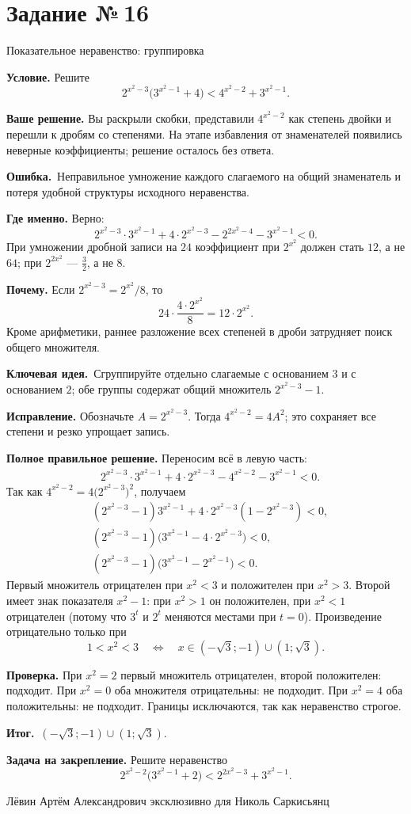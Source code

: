 \documentclass[a4paper,11pt]{article}
\newcommand{\Hdr}[1]{\par\vspace{2pt}\noindent\textbf{#1}\quad}
\newcommand{\E}{\par\smallskip\noindent\textcolor{errorred}{\textbf{Ошибка.}}\ }
\newcommand{\K}{\par\smallskip\noindent\textcolor{accent}{\textbf{Ключевая идея.}}\ }
\newcommand{\I}{\par\smallskip\noindent\textcolor{accent}{\textbf{Итог.}}\ }
\newcommand{\Task}[2]{\clearpage\phantomsection\label{task:#1}\section*{Задание №\,#1}\textcolor{accent}{#2}\par\vspace{7pt}}
\newcommand{\Footer}{\par\vfill\begin{center}\footnotesize\color{ink}Лёвин Артём Александрович эксклюзивно для Николь Саркисьянц\end{center}}
\begin{document}
\Task{16}{Показательное неравенство: группировка}
\Hdr{Условие.} Решите
\[
2^{x^2-3}\bigl(3^{x^2-1}+4\bigr)<4^{x^2-2}+3^{x^2-1}.
\]
\Hdr{Ваше решение.} Вы раскрыли скобки, представили $4^{x^2-2}$ как степень двойки и перешли к дробям со степенями. На этапе избавления от знаменателей появились неверные коэффициенты; решение осталось без ответа.
\E Неправильное умножение каждого слагаемого на общий знаменатель и потеря удобной структуры исходного неравенства.
\Hdr{Где именно.} Верно:
\[
2^{x^2-3}\cdot3^{x^2-1}+4\cdot2^{x^2-3}-2^{2x^2-4}-3^{x^2-1}<0.
\]
При умножении дробной записи на $24$ коэффициент при $2^{x^2}$ должен стать $12$, а не $64$; при $2^{2x^2}$ --- $\frac32$, а не $8$.
\Hdr{Почему.} Если $2^{x^2-3}=2^{x^2}/8$, то
\[
24\cdot\frac{4\cdot2^{x^2}}8=12\cdot2^{x^2}.
\]
Кроме арифметики, раннее разложение всех степеней в дроби затрудняет поиск общего множителя.
\K Сгруппируйте отдельно слагаемые с основанием $3$ и с основанием $2$; обе группы содержат общий множитель $2^{x^2-3}-1$.
\Hdr{Исправление.} Обозначьте $A=2^{x^2-3}$. Тогда $4^{x^2-2}=4A^2$; это сохраняет все степени и резко упрощает запись.
\Hdr{Полное правильное решение.} Переносим всё в левую часть:
\[
\begin{aligned}
&2^{x^2-3}\cdot3^{x^2-1}+4\cdot2^{x^2-3}
-4^{x^2-2}-3^{x^2-1}<0.\end{aligned}
\]
Так как $4^{x^2-2}=4\bigl(2^{x^2-3}\bigr)^2$, получаем
\[
\begin{aligned}
&(2^{x^2-3}-1)3^{x^2-1}
 +4\cdot2^{x^2-3}(1-2^{x^2-3})<0,\\
&(2^{x^2-3}-1)\bigl(3^{x^2-1}-4\cdot2^{x^2-3}\bigr)<0,\\
&(2^{x^2-3}-1)\bigl(3^{x^2-1}-2^{x^2-1}\bigr)<0.
\end{aligned}
\]
Первый множитель отрицателен при $x^2<3$ и положителен при $x^2>3$. Второй имеет знак показателя $x^2-1$: при $x^2>1$ он положителен, при $x^2<1$ отрицателен (потому что $3^t$ и $2^t$ меняются местами при $t=0$). Произведение отрицательно только при
\[
1<x^2<3
\quad\Longleftrightarrow\quad
\boxed{x\in(-\sqrt3;-1)\cup(1;\sqrt3)}.
\]
\Hdr{Проверка.} При $x^2=2$ первый множитель отрицателен, второй положителен: подходит. При $x^2=0$ оба множителя отрицательны: не подходит. При $x^2=4$ оба положительны: не подходит. Границы исключаются, так как неравенство строгое.
\I $(-\sqrt3;-1)\cup(1;\sqrt3)$.
\Hdr{Задача на закрепление.} Решите неравенство
\[2^{x^2-2}\bigl(3^{x^2-1}+2\bigr)<2^{2x^2-3}+3^{x^2-1}.\]
\Footer
\end{document}
